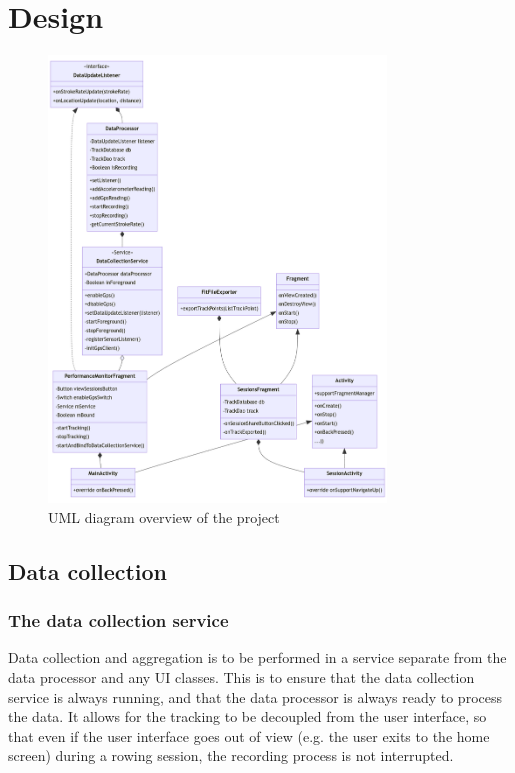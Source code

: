 \documentclass[11pt,twoside,a4paper]{report}
\begin{document}
\chapter{Design}

\begin{figure}[h!]
  \centering
  \includegraphics[width=0.8\textwidth]{umldiagram.png}
  \caption{UML diagram overview of the project}
  \label{fig:umldiagram}
\end{figure}


\section{Data collection}

\subsection{The data collection service}

Data collection and aggregation is to be performed in a service separate from the data processor and any UI classes. This is to ensure that the data collection service is always running, and that the data processor is always ready to process the data. It allows for the tracking to be decoupled from the user interface, so that even if the user interface goes out of view (e.g. the user exits to the home screen) during a rowing session, the recording process is not interrupted. 
\end{document}
